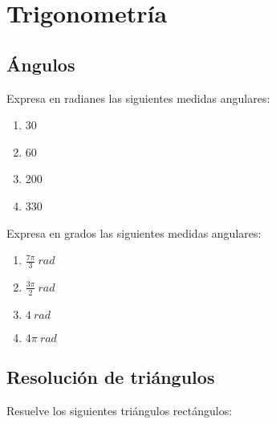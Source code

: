 \chapter{Trigonometría}
\setcounter{exercicio}{0}

\section{Ángulos}

\Exercicio Expresa en radianes las siguientes medidas angulares:

\begin{enumerate}[topsep=0pt]
	\item 30\textdegree
	\item 60\textdegree
	\item 200\textdegree
	\item 330\textdegree
\end{enumerate}


\Exercicio Expresa en grados las siguientes medidas angulares:

\begin{enumerate}[topsep=0pt]
	\item $ \frac{7\pi}{3}~rad $
	\item $ \frac{3\pi}{2}~rad $
	\item $ 4~rad$
	\item $ 4\pi~rad $
\end{enumerate}

\section{Resolución de triángulos}

\Exercicio Resuelve los siguientes triángulos rectángulos:

